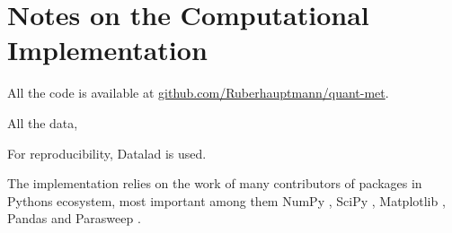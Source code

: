 \documentclass[../notes.tex]{subfiles}
\begin{document}
\chapter{Notes on the Computational Implementation}

All the code is available at \href{https://github.com/Ruberhauptmann/quant-met}{github.com/Ruberhauptmann/quant-met}.

All the data, 

For reproducibility, Datalad \cite{halchenkoDataLadDistributedSystem2021} is used.

The implementation relies on the work of many contributors of packages in Pythons ecosystem, most important among them NumPy \cite{harrisArrayProgrammingNumPy2020}, SciPy \cite{virtanenSciPy10Fundamental2020}, Matplotlib \cite{hunterMatplotlib2DGraphics2007}, Pandas \cite{mckinneyDataStructuresStatistical2010, thepandasdevelopmentteamPandasdevPandasPandas2024} and Parasweep \cite{bachParasweepTemplatebasedUtility2021}.
	
\end{document}
